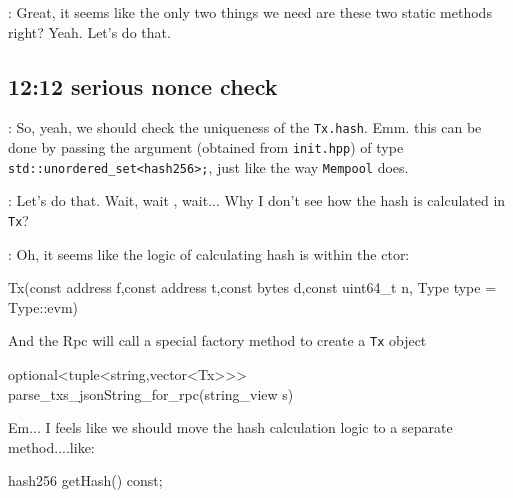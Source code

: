  : Great, it seems like the only two things we need are these two
static methods right? Yeah. Let's do that.

\subsection*{12:12 serious nonce check}


 : So, yeah, we should check the uniqueness of the
\texttt{Tx.hash}. Emm. this can be done by passing the argument (obtained from
\texttt{init.hpp}) of type \texttt{std::unordered\_set<hash256>;}, just like the
way \texttt{Mempool} does.

 : Let's do that. Wait, wait , wait... Why I don't see how the
hash is calculated in \texttt{Tx}?

 : Oh, it seems like the logic of calculating hash is within the ctor:

\begin{simplec}
Tx(const address f,const address t,const bytes d,const uint64_t n, Type type = Type::evm)
\end{simplec}

And the Rpc will call a special factory method to create a \texttt{Tx} object

\begin{simplec}
optional<tuple<string,vector<Tx>>> parse_txs_jsonString_for_rpc(string_view s)
\end{simplec}

Em... I feels like we should move the hash calculation logic to a separate
method....like:

\begin{simplec}
hash256 getHash() const;
\end{simplec}

